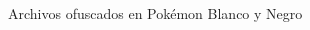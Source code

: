 \begin{frame}[fragile]{Archivos ofuscados en Pokémon Blanco y Negro}
\begin{columns}
\begin{column}{0.25\textwidth}
    \vfill
\end{column}


\end{columns}
\end{frame}
